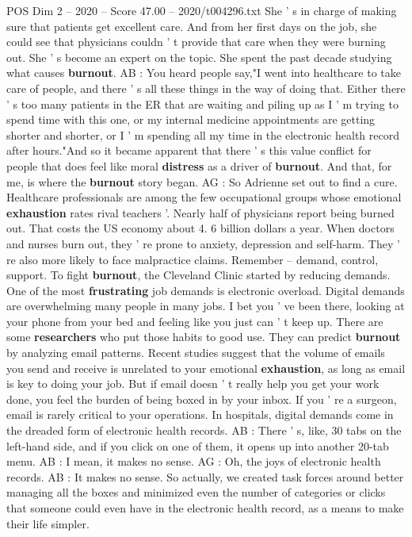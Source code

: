 \begin{textsample}{POS Dim 2 – 2020 – Score 47.00 – 2020/t004296.txt}
She ' s in charge of making sure that patients get excellent care.
And from her first days on the job, she could see that physicians couldn ' t provide that care when they were burning out.
She ' s become an expert on the topic.
She spent the past decade studying what causes \textbf{burnout}.
AB : You heard people say,"I went into healthcare to take care of people, and there ' s all these things in the way of doing that.
Either there ' s too many patients in the ER that are waiting and piling up as I ' m trying to spend time with this one, or my internal medicine appointments are getting shorter and shorter, or I ' m spending all my time in the electronic health record after hours."And so it became apparent that there ' s this value conflict for people that does feel like moral \textbf{distress} as a driver of \textbf{burnout}.
And that, for me, is where the \textbf{burnout} story began.
AG : So Adrienne set out to find a cure.
Healthcare professionals are among the few occupational groups whose emotional \textbf{exhaustion} rates rival teachers '.
Nearly half of physicians report being burned out.
That costs the US economy about 4. 6 billion dollars a year.
When doctors and nurses burn out, they ' re prone to anxiety, depression and self-harm.
They ' re also more likely to face malpractice claims.
Remember -- demand, control, support.
To fight \textbf{burnout}, the Cleveland Clinic started by reducing demands.
One of the most \textbf{frustrating} job demands is electronic overload.
Digital demands are overwhelming many people in many jobs.
I bet you ' ve been there, looking at your phone from your bed and feeling like you just can ' t keep up.
There are some \textbf{researchers} who put those habits to good use.
They can predict \textbf{burnout} by analyzing email patterns.
Recent studies suggest that the volume of emails you send and receive is unrelated to your emotional \textbf{exhaustion}, as long as email is key to doing your job.
But if email doesn ' t really help you get your work done, you feel the burden of being boxed in by your inbox.
If you ' re a surgeon, email is rarely critical to your operations.
In hospitals, digital demands come in the dreaded form of electronic health records.
AB : There ' s, like, 30 tabs on the left-hand side, and if you click on one of them, it opens up into another 20-tab menu.
AB : I mean, it makes no sense.
AG : Oh, the joys of electronic health records.
AB : It makes no sense.
So actually, we created task forces around better managing all the boxes and minimized even the number of categories or clicks that someone could even have in the electronic health record, as a means to make their life simpler.

\end{textsample}
